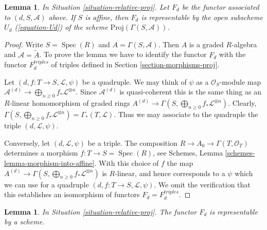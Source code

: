 \documentclass{stacks-project}
\theoremstyle{plain}
\newtheorem{lemma}[subsection]{Lemma}
\theoremstyle{definition}
\theoremstyle{remark}
\numberwithin{equation}{subsection}
\def\Spec{\mathop{\mathrm{Spec}}}
\begin{document}
\begin{lemma}
\label{lemma-relative-proj-affine}
In Situation \ref{situation-relative-proj}. Let $F_d$ be the functor
associated to $(d, S, \mathcal{A})$ above.
If $S$ is affine, then $F_d$ is representable by the open subscheme
$U_d$ (\ref{equation-Ud})
of the scheme $\text{Proj}(\Gamma(S, \mathcal{A}))$.
\end{lemma}

\begin{proof}
Write $S = \Spec(R)$ and $A = \Gamma(S, \mathcal{A})$.
Then $A$ is a graded $R$-algebra and $\mathcal{A} = \widetilde A$.
To prove the lemma we have to identify the functor $F_d$
with the functor $F_d^{triples}$ of triples defined in Section
\ref{section-morphisms-proj}.

\medskip\noindent
Let $(d, f : T \to S, \mathcal{L}, \psi)$ be a quadruple.
We may think of $\psi$ as a $\mathcal{O}_S$-module map
$\mathcal{A}^{(d)} \to \bigoplus_{n \geq 0} f_*\mathcal{L}^{\otimes n}$.
Since $\mathcal{A}^{(d)}$ is quasi-coherent this is the same
thing as an $R$-linear homomorphism of graded rings
$A^{(d)} \to \Gamma(S, \bigoplus_{n \geq 0} f_*\mathcal{L}^{\otimes n})$.
Clearly, $\Gamma(S, \bigoplus_{n \geq 0} f_*\mathcal{L}^{\otimes n}) =
\Gamma_*(T, \mathcal{L})$. Thus we may associate to
the quadruple the triple $(d, \mathcal{L}, \psi)$.

\medskip\noindent
Conversely, let $(d, \mathcal{L}, \psi)$ be a triple.
The composition $R \to A_0 \to \Gamma(T, \mathcal{O}_T)$
determines a morphism $f : T \to S = \Spec(R)$, see
Schemes, Lemma \ref{schemes-lemma-morphism-into-affine}.
With this choice of $f$ the map
$A^{(d)} \to \Gamma(S, \bigoplus_{n \geq 0} f_*\mathcal{L}^{\otimes n})$
is $R$-linear, and hence corresponds to a $\psi$ which we
can use for a quadruple $(d, f : T \to S, \mathcal{L}, \psi)$.
We omit the verification that this establishes an isomorphism
of functors $F_d = F_d^{triples}$.
\end{proof}

\begin{lemma}
\label{lemma-relative-proj-d}
In Situation \ref{situation-relative-proj}.
The functor $F_d$ is representable by a scheme.
\end{lemma}
\end{document}
